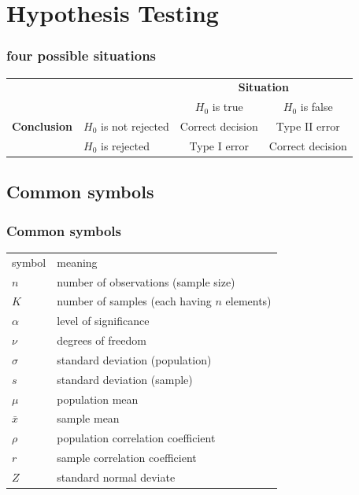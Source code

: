 \documentclass[xcolor={table}]{beamer}
\begin{document}
\section{Hypothesis Testing}
\begin{frame}\frametitle{four possible situations}\footnotesize
\begin{tabular}{cl|c|c|}
  &  \multicolumn{1}{c}{}& \multicolumn{2}{c}{\textbf{Situation}} \\
  &  \multicolumn{1}{c}{}& \multicolumn{1}{c}{$H_0$ is true} & \multicolumn{1}{c}{$H_0$ is false} \\
\cline{3-4}
\textbf{Conclusion} & $H_0$ is not rejected &  Correct decision  & Type II error \\
\cline{3-4}
 & $H_0$ is rejected & Type I error &  Correct decision  \\
\cline{3-4}
\end{tabular}
\end{frame}


\subsection{Common symbols}
\begin{frame}\frametitle{Common symbols}
  \begin{tabular}{@{} >{\ttfamily}l l@{}} 
    \rowcolor{gray!40}symbol & meaning \\
    $n$ & number of observations (sample size)\\
    $K$ & number of samples (each having $n$ elements) \\
    $\alpha$ & level of significance \\
    $\nu$ & degrees of freedom \\
    $\sigma$ & standard deviation (population)\\
    $s$ & standard deviation (sample)\\
    $\mu$ & population mean \\
    $\bar{x}$ & sample mean \\
    $\rho $ & population correlation coefficient \\
    $r$ & sample correlation coefficient \\
    $Z$ & standard normal deviate \\
  \end{tabular}
\end{frame}
\end{document}
